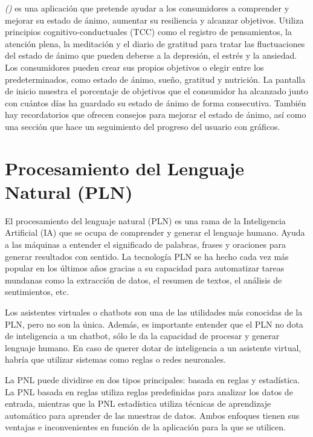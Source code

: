 {{{{{\textit{(\cite{moodfit2016})} es una aplicación que pretende ayudar a los consumidores a comprender y mejorar su estado de ánimo, aumentar su resiliencia y alcanzar objetivos. Utiliza principios cognitivo-conductuales (TCC) como el registro de pensamientos, la atención plena, la meditación y el diario de gratitud para tratar las fluctuaciones del estado de ánimo que pueden deberse a la depresión, el estrés y la ansiedad. Los consumidores pueden crear sus propios objetivos o elegir entre los predeterminados, como estado de ánimo, sueño, gratitud y nutrición. La pantalla de inicio muestra el porcentaje de objetivos que el consumidor ha alcanzado junto con cuántos días ha guardado su estado de ánimo de forma consecutiva. También hay recordatorios que ofrecen consejos para mejorar el estado de ánimo, así como una sección que hace un seguimiento del progreso del usuario con gráficos.


\section{Procesamiento del Lenguaje Natural (PLN)}

El procesamiento del lenguaje natural (PLN) es una rama de la Inteligencia Artificial (IA) que se ocupa de comprender y generar el lenguaje humano. Ayuda a las máquinas a entender el significado de palabras, frases y oraciones para generar resultados con sentido. La tecnología PLN se ha hecho cada vez más popular en los últimos años gracias a su capacidad para automatizar tareas mundanas como la extracción de datos, el resumen de textos, el análisis de sentimientos, etc.{\vspace{0.3cm}


Los asistentes virtuales o chatbots son una de las utilidades más conocidas de la PLN, pero no son la única. Además, es importante entender que el PLN no dota de inteligencia a un chatbot, sólo le da la capacidad de procesar y generar lenguaje humano. En caso de querer dotar de inteligencia a un asistente virtual, habría que utilizar sistemas como reglas o redes neuronales.{\vspace{0.3cm}


La PNL puede dividirse en dos tipos principales: basada en reglas y estadística. La PNL basada en reglas utiliza reglas predefinidas para analizar los datos de entrada, mientras que la PNL estadística utiliza técnicas de aprendizaje automático para aprender de las muestras de datos. Ambos enfoques tienen sus ventajas e inconvenientes en función de la aplicación para la que se utilicen.\vspace{1cm}


}}}}}}}
